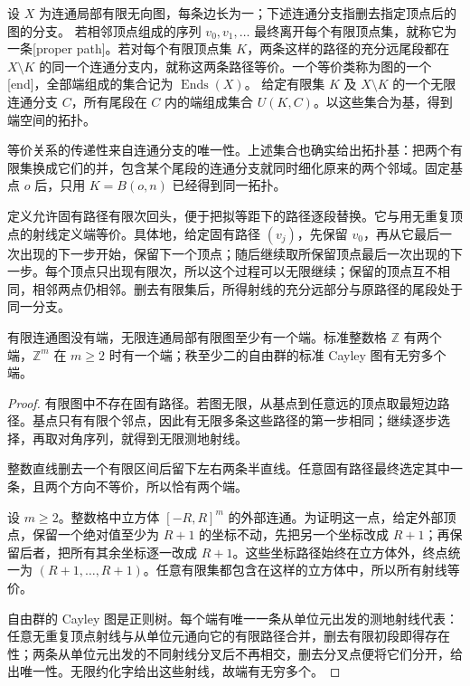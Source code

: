 \begin{definition}\label{g3:def:D-ends}
	设 \(X\) 为连通局部有限无向图，每条边长为一；下述连通分支指删去指定顶点后的图的分支。
	若相邻顶点组成的序列 \(v_0,v_1,\ldots\) 最终离开每个有限顶点集，就称它为一条[proper path]。若对每个有限顶点集 \(K\)，两条这样的路径的充分远尾段都在 \(X\setminus K\) 的同一个连通分支内，就称这两条路径等价。一个等价类称为图的一个[end]，全部端组成的集合记为 \(\operatorname{Ends}(X)\)。
	给定有限集 \(K\) 及 \(X\setminus K\) 的一个无限连通分支 \(C\)，所有尾段在 \(C\) 内的端组成集合 \(U(K,C)\)。以这些集合为基，得到端空间的拓扑。
\end{definition}

等价关系的传递性来自连通分支的唯一性。上述集合也确实给出拓扑基：把两个有限集换成它们的并，包含某个尾段的连通分支就同时细化原来的两个邻域。固定基点 \(o\) 后，只用 \(K=B(o,n)\) 已经得到同一拓扑。

\ProseParagraphBreak

定义允许固有路径有限次回头，便于把拟等距下的路径逐段替换。它与用无重复顶点的射线定义端等价。具体地，给定固有路径 \((v_j)\)，先保留 \(v_0\)，再从它最后一次出现的下一步开始，保留下一个顶点；随后继续取所保留顶点最后一次出现的下一步。每个顶点只出现有限次，所以这个过程可以无限继续；保留的顶点互不相同，相邻两点仍相邻。删去有限集后，所得射线的充分远部分与原路径的尾段处于同一分支。

\begin{proposition}\label{g3:prop:D-basic-ends}
	有限连通图没有端，无限连通局部有限图至少有一个端。标准整数格 \(\mathbb Z\) 有两个端，\(\mathbb Z^m\) 在 \(m\ge2\) 时有一个端；秩至少二的自由群的标准 Cayley 图有无穷多个端。
\end{proposition}
\begin{proof}
	有限图中不存在固有路径。若图无限，从基点到任意远的顶点取最短边路径。基点只有有限个邻点，因此有无限多条这些路径的第一步相同；继续逐步选择，再取对角序列，就得到无限测地射线。

	整数直线删去一个有限区间后留下左右两条半直线。任意固有路径最终选定其中一条，且两个方向不等价，所以恰有两个端。

	设 \(m\ge2\)。整数格中立方体 \([-R,R]^m\) 的外部连通。为证明这一点，给定外部顶点，保留一个绝对值至少为 \(R+1\) 的坐标不动，先把另一个坐标改成 \(R+1\)；再保留后者，把所有其余坐标逐一改成 \(R+1\)。这些坐标路径始终在立方体外，终点统一为 \((R+1,\ldots,R+1)\)。任意有限集都包含在这样的立方体中，所以所有射线等价。

	自由群的 Cayley 图是正则树。每个端有唯一一条从单位元出发的测地射线代表：任意无重复顶点射线与从单位元通向它的有限路径合并，删去有限初段即得存在性；两条从单位元出发的不同射线分叉后不再相交，删去分叉点便将它们分开，给出唯一性。无限约化字给出这些射线，故端有无穷多个。
\end{proof}

